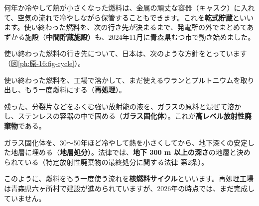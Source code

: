 何年か冷やして熱が小さくなった燃料は、金属の頑丈な容器（キャスク）に入れて、空気の流れで冷やしながら保管することもできます。これを\textbf{乾式貯蔵}といいます。使い終わった燃料を、次の行き先が決まるまで、発電所の外でまとめてあずかる施設（\textbf{中間貯蔵施設}）も、2024年11月に青森県むつ市で動き始めました。

\leavevmode\label{ph:原-16:sec3}使い終わった燃料の行き先について、日本は、次のような方針をとっています（図\ref{ph:原-16:fig-cycle}）。
\begin{enumerate}[label={\bkcircled[bkTheme]{\arabic*}}, leftmargin=2.4\zw, itemsep=1pt, topsep=2pt]
\item 使い終わった燃料を、工場で溶かして、まだ使えるウランとプルトニウムを取り出し、もう一度燃料にする（\textbf{再処理}）。
\item 残った、分裂片などをふくむ強い放射能の液を、ガラスの原料と混ぜて溶かし、ステンレスの容器の中で固める（\textbf{ガラス固化体}）。これが\textbf{高レベル放射性廃棄物}である。
\item ガラス固化体を、30〜50年ほど冷やして熱を小さくしてから、地下深くの安定した地層に埋める（\textbf{地層処分}）。法律では、\textbf{地下 300 m 以上の深さ}の地層と決められている（特定放射性廃棄物の最終処分に関する法律 第2条）。
\end{enumerate}
このように、燃料をもう一度使う流れを\textbf{核燃料サイクル}といいます。再処理工場は青森県六ヶ所村で建設が進められていますが、2026年の時点では、まだ完成していません。

